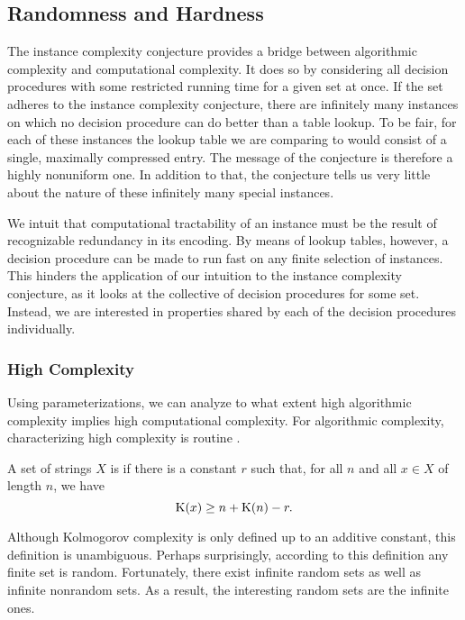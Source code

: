 \subsection{Randomness and Hardness}
\label{sec:randomness_hardness}%
The instance complexity conjecture provides a bridge between algorithmic complexity and computational complexity.
It does so by considering all decision procedures with some restricted running time for a given set at once.
If the set adheres to the instance complexity conjecture, there are infinitely many instances on which no decision procedure can do better than a table lookup.
To be fair, for each of these instances the lookup table we are comparing to would consist of a single, maximally compressed entry.
The message of the conjecture is therefore a highly nonuniform one.
In addition to that, the conjecture tells us very little about the nature of these infinitely many special instances.

We intuit that computational tractability of an instance must be the result of recognizable redundancy in its encoding.
By means of lookup tables, however, a decision procedure can be made to run fast on any finite selection of instances.
This hinders the application of our intuition to the instance complexity conjecture, as it looks at the collective of decision procedures for some set.
Instead, we are interested in properties shared by each of the decision procedures individually.

\subsubsection{High Complexity}
Using parameterizations, we can analyze to what extent high algorithmic complexity implies high computational complexity.
For algorithmic complexity, characterizing high complexity is routine \parencite{li2008introduction}.
\begin{definition}
\label{def:random}%
  A set of strings $X$ is  if there is a constant $r$ such that, for all $n$ and all $x \in X$ of length $n$, we have
  \begin{equation*}
    \operatorname{K}(x) \ge n + \operatorname{K}(n) - r.
  \end{equation*}
\end{definition}

Although Kolmogorov complexity is only defined up to an additive constant, this definition is unambiguous.
Perhaps surprisingly, according to this definition any finite set is random.
Fortunately, there exist infinite random sets as well as infinite nonrandom sets.
As a result, the interesting random sets are the infinite ones.

